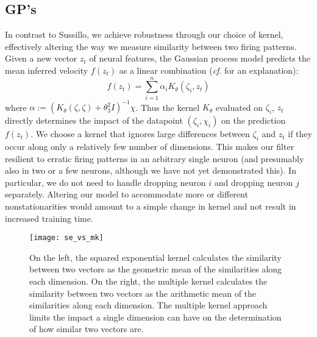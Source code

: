 \subsection{GP's} 
In contrast to Sussillo, we achieve robustness through our choice of kernel, effectively altering the way we measure similarity between two firing patterns.  Given a new vector $z_t$ of neural features, the Gaussian process model predicts the mean inferred velocity $f(z_t)$ as a linear combination (\emph{cf}. \cite{Ras06} for an explanation):
\[
f(z_t) = \sum_{i=1}^n \alpha_i K_\theta(\zeta_i, z_t)
\]
where $\alpha := (K_\theta(\zeta,\zeta)+\theta_3^2I)^{-1}\chi$.  Thus the kernel $K_\theta$ evaluated on $\zeta_i$, $z_t$ directly determines the impact of the datapoint $(\zeta_i,\chi_i)$ on the prediction $f(z_t)$.  We choose a kernel that ignores large differences between $\zeta_i$ and $z_t$ if they occur along only a relatively few number of dimensions.  This makes our filter resilient to erratic firing patterns in an arbitrary single neuron (and presumably also in two or a few neurons, although we have not yet demonstrated this).  In particular, we do not need to handle dropping neuron $i$ and dropping neuron $j$ separately.  Altering our model to accommodate more or different nonstationarities would amount to a simple change in kernel and not result in increased training time.  

\begin{figure}[h]
\texttt{[image: se\_vs\_mk]}
\caption[Comparison of Squared Exponential and Multiple Kernels]{On the left, the squared exponential kernel calculates the similarity between two vectors as the geometric mean of the similarities along each dimension.  On the right, the multiple kernel calculates the similarity between two vectors as the arithmetic mean of the similarities along each dimension.  The multiple kernel approach limits the impact a single dimension can have on the determination of how similar two vectors are.}
\end{figure}

